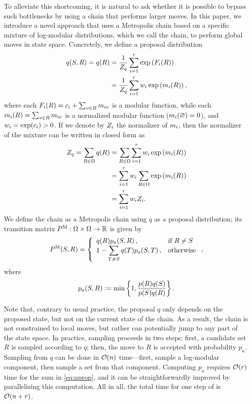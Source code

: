 To alleviate this shortcoming, it is natural to ask whether it is possible to bypass such bottlenecks by using a chain that performs larger moves.
In this paper, we introduce a novel approach that uses a Metropolis chain based on a specific mixture of log-modular distributions, which we call the \Ms{} chain, to perform global moves in state space.
Concretely, we define a proposal distribution
\begin{align} \label{eq:qprop}
  q(S, R) = q(R) &= \frac{1}{Z_q} \sum_{i = 1}^{r} \exp\left( F_i(R) \right) \nonumber\\
                 &= \frac{1}{Z_q} \sum_{i = 1}^{r} w_i \exp\left(m_i(R) \right),
\end{align}
where each $F_i(R) = c_i + \sum_{v \in R}m_{iv}$ is a modular function, while each $m_i(R) = \sum_{v \in R}m_{iv}$ is a normalized modular function ($m_i(\varnothing) = 0$), and $w_i = \exp(c_i) > 0$.
If we denote by $Z_i$ the normalizer of $m_i$, then the normalizer of the mixture can be written in closed form as
\begin{align*}
  Z_q = \sum_{R \in \Omega}q(R) &= \sum_{R \in \Omega}\sum_{i = 1}^{r} w_i \exp\left(m_i(R) \right)\\
                                &= \sum_{i = 1}^{r} w_i \sum_{R \in \Omega} \exp\left(m_i(R) \right)\\
                                &= \sum_{i = 1}^r w_i Z_i.
\end{align*}
We define the \Ms{} chain as a Metropolis chain using $q$ as a proposal distribution; its transition matrix $P^{\mathrm{M}} : \Omega \times \Omega \to \mathbb{R}$ is given by
\begin{align*}
  P^{\mathrm{M}}(S, R) = \left\{ \begin{array}{ll} q(R) p_a(S, R)\,,& \mbox{if } R \neq S \\ 1 - \displaystyle\sum_{T \neq S} q(T) p_a(S, T)\,,& \mbox{otherwise} \end{array} \right.,
\end{align*}
where
\begin{align*}
  p_{a}(S, R) \vcentcolon= \min\left\{1, \displaystyle\frac{p(R)q(S)}{p(S)q(R)}\right\}.
\end{align*}

Note that, contrary to usual practice, the proposal $q$ only depends on the proposed state, but not on the current state of the chain.
As a result, the chain is not constrained to local moves, but rather can potentially jump to any part of the state space.
In practice, \Ms{} sampling proceeds in two steps: first, a candidate set $R$ is sampled according to $q$; then, the move to $R$ is accepted with probability $p_a$.
Sampling from $q$ can be done in $\mathcal{O}(n)$ time---first, sample a log-modular component, then sample a set from that component.
Computing $p_a$ requires $\mathcal{O}(r)$ time for the sum in \eqref{eq:qprop}, and it can be straightforwardly improved by parallelizing this computation.
All in all, the total time for one step of \Ms{} is $\mathcal{O}(n + r)$.

